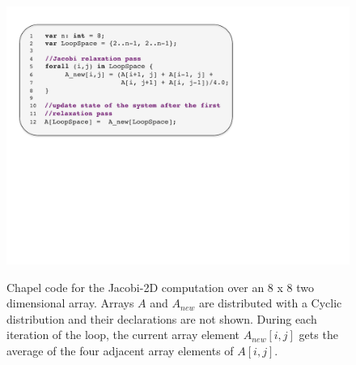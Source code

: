 \begin{figure}
\begin{center}
\includegraphics[width=\linewidth]{./Figures/jacobi}
\renewcommand{\baselinestretch}{1}
\small\normalsize
\begin{quote}
\caption[Chapel code for the Jacobi-2D computation]{Chapel code for the Jacobi-2D computation over an 8 x 8 two dimensional array. Arrays $A$ and $A_{new}$ are distributed with a Cyclic distribution and their declarations are not shown. During each iteration of the loop, the current array element $A_{new}[i, j]$ gets the average of the four adjacent array elements of $A[i, j]$.\label{jacobi_code}}
\end{quote}
\end{center}
\end{figure}

